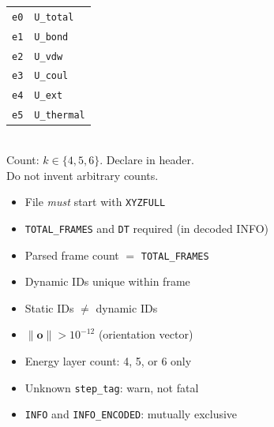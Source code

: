 \documentclass[12pt, a4paper, oneside]{article}
\begin{document}
\begin{tcolorbox}
\begin{multicols}{2}
\medskip
\begin{tcolorbox}[
  colback=okgreenlight, colframe=okgreen,
  boxrule=0.7pt, arc=3pt, left=4pt, right=4pt, top=3pt, bottom=3pt,
  title={\bfseries\small Energy Layers},
  fonttitle=\small\bfseries, attach title to upper, after title={\\[2pt]}
]
\small
\begin{tabular}{ll}
\texttt{e0} & \texttt{U\_total} \\
\texttt{e1} & \texttt{U\_bond} \\
\texttt{e2} & \texttt{U\_vdw} \\
\texttt{e3} & \texttt{U\_coul} \\
\texttt{e4} & \texttt{U\_ext} \\
\texttt{e5} & \texttt{U\_thermal} \\
\end{tabular}\\[4pt]
Count: $k \in \{4, 5, 6\}$.  Declare in header.\\
Do not invent arbitrary counts.
\end{tcolorbox}

\columnbreak

\begin{tcolorbox}[
  colback=specgoldlight, colframe=specgold,
  boxrule=0.7pt, arc=3pt, left=4pt, right=4pt, top=3pt, bottom=3pt,
  title={\bfseries\small Key Constraints},
  fonttitle=\small\bfseries, attach title to upper, after title={\\[2pt]}
]
\small
\begin{itemize}[leftmargin=1em]
  \item File \emph{must} start with \texttt{XYZFULL}
  \item \texttt{TOTAL\_FRAMES} and \texttt{DT} required (in decoded INFO)
  \item Parsed frame count $=$ \texttt{TOTAL\_FRAMES}
  \item Dynamic IDs unique within frame
  \item Static IDs $\neq$ dynamic IDs
  \item $\|\mathbf{o}\| > 10^{-12}$ (orientation vector)
  \item Energy layer count: 4, 5, or 6 only
  \item Unknown \texttt{step\_tag}: warn, not fatal
  \item \texttt{INFO} and \texttt{INFO\_ENCODED}: mutually exclusive
\end{itemize}
\end{tcolorbox}


\end{multicols}
\end{tcolorbox}
\end{document}

